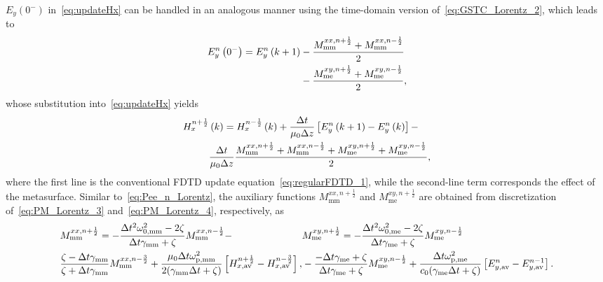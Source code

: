 \documentclass[journal]{IEEEtran}
\begin{document}
$E_y(0^-)$ in~\eqref{eq:updateHx} can be handled in an analogous manner using the time-domain version of~\eqref{eq:GSTC_Lorentz_2}, which leads to
\begin{align}\label{eq:Ey0n_Lorentz}
    E_y^n\left(0^-\right) = E_y^n\left(k +1\right) &-\frac{M_\textrm{mm}^{xx,n+\frac{1}{2}}+M_\textrm{mm}^{xx,n-\frac{1}{2}}}{2}\\\notag &-\frac{M_\textrm{me}^{xy,n+\frac{1}{2}}+M_\textrm{me}^{xy,n-\frac{1}{2}}}{2},
\end{align}
whose substitution into~\eqref{eq:updateHx} yields
\begin{align}\label{eq:Hx_update}
  H_x^{n+\frac{1}{2}}&\left(k\right)=H_x^{n-\frac{1}{2}}\left(k\right)+\frac{\Delta t}{\mu_0\Delta z}\left[E_y^n\left(k+1\right)-E_y^n\left(k\right)\right]-\\\notag &\frac{\Delta t}{\mu_0 \Delta z}\frac{M_\textrm{mm}^{xx,n+\frac{1}{2}}+M_\textrm{mm}^{xx,n-\frac{1}{2}}+ M_\textrm{me}^{xy,n+\frac{1}{2}}+M_\textrm{me}^{xy,n-\frac{1}{2}}}{2},
\end{align}
where the first line is the conventional FDTD update equation~\eqref{eq:regularFDTD_1}, while  the second-line term corresponds the effect of the metasurface. Similar to~\eqref{eq:Pee_n_Lorentz}, the auxiliary functions $M_\textrm{mm}^{xx,n+\frac{1}{2}}$ and $M_\textrm{me}^{xy,n+\frac{1}{2}}$ are obtained from discretization of~\eqref{eq:PM_Lorentz_3} and~\eqref{eq:PM_Lorentz_4}, respectively, as
\begin{subequations}\label{eq:Mmm_n_Lorentz}
\begin{align}\label{eq:Mmm_n_Lorentz_1}
    &M_\textrm{mm}^{xx,n+\frac{1}{2}}=-\frac{\Delta t^2\omega^2_\textrm{0,mm}-2\zeta}{\Delta t\gamma_\textrm{mm} +\zeta}M_\textrm{mm}^{xx,n-\frac{1}{2}}-\\\notag&\frac{\zeta-\Delta t\gamma_\textrm{mm}}{\zeta+\Delta t\gamma_\textrm{mm}}M_\textrm{mm}^{xx,n-\frac{3}{2}}+\frac{\mu_0\Delta t\omega^2_\textrm{p,mm}}{2(\gamma_\textrm{mm}\Delta t+\zeta)}\left[ H_{x,\textrm{av}}^{n+\frac{1}{2}}-H_{x,\textrm{av}}^{n-\frac{3}{2}}\right],
\end{align}
  \begin{align}\label{eq:Mmm_n_Lorentz_2}
    &M_\textrm{me}^{xy,n+\frac{1}{2}}=-\frac{\Delta t^2\omega^2_\textrm{0,me}-2\zeta}{\Delta t\gamma_\textrm{me}+\zeta}M_\textrm{me}^{xy,n-\frac{1}{2}}\\\notag&-\frac{-\Delta t\gamma_\textrm{me}+\zeta}{\Delta t\gamma_\textrm{me} +\zeta}M_\textrm{me}^{xy,n-\frac{1}{2}}+\frac{\Delta t\omega^2_\textrm{p,me}}{c_0(\gamma_\textrm{me}\Delta t+\zeta)}\left[ E_{y,\textrm{av}}^{n}-E_{y,\textrm{av}}^{n-1}\right].
  \end{align}
\end{subequations}
\end{document}
